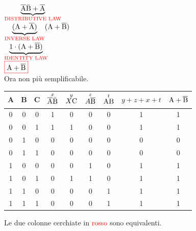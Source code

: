 $ \underbrace{\overline{\text{A}}\bar{\text{B}} + \overline{\text{A}}} _{\textrm{\color{red} DISTRIBUTIVE LAW}} $ \\

$ \underbrace{(\text{A} + \overline{\text{A}})} _{\textrm{\color{red} INVERSE LAW}}(\text{A} + \overline{\text{B}}) $ \\

$ \underbrace{1 \cdot(\text{A} + \overline{\text{B}})} _{\textrm{\color{red} IDENTITY LAW}} $ \\

$ \color{red}\boxed{\normalcolor\A + \negatoB} $ \\

\enlargethispage{30pt}
\textsf{{\small Ora non più semplificabile.}} \\

\centering

\pagebreak

\begin{tabular}{|c|c|c|c||c||c|c|c|c|}
	\hline
	A & B & C & $\overset{x}{\overline{\text{A}}\bar{\text{B}}}$ & $\overset{y}{X\text{C}}$ & $\overset{z}{A\overline{\text{B}}}$ & $ \overset{t}{\text{A}\text{B}} $ &$ y + z + x + t $ & $\text{A} + \overline{\text{B}}$\\
	\hline
	0 & 0 & 0 & 1 & 0 & 0 & 0 & 1 & 1\\
	\hline
	0 & 0 & 1 & 1 & 1 & 0 & 0 & 1 & 1\\
	\hline
	0 & 1 & 0 & 0 & 0 & 0 & 0 & 0 & 0\\
	\hline
	0 & 1 & 1 & 0 & 0 & 0 & 0 & 0 & 0\\
	\hline
	1 & 0 & 0 & 0 & 0 & 1 & 0 & 1 & 1\\
	\hline
	1 & 0 & 1 & 0 & 1 & 1 & 0 & 1 & 1\\
	\hline
	1 & 1 & 0 & 0 & 0 & 0 & 1 & 1 & 1\\
	\hline
	1 & 1 & 1 & 0 & 0 & 0 & 1 & 1 & 1\\
	\hline
\end{tabular}


\textsf{{\small Le due colonne cerchiate in \textcolor{red}{rosso} sono equivalenti.}} \\

\flushleft


